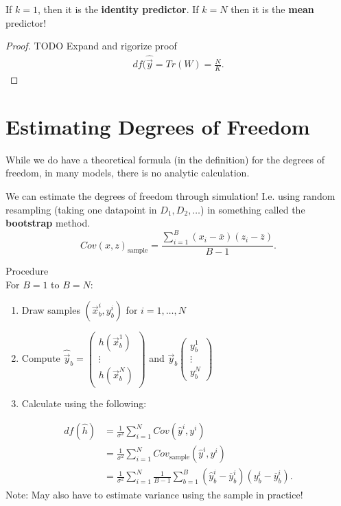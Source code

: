 \documentclass[a4paper]{article}
\begin{document}
\begin{remark}
  If $k=1$, then it is the \textbf{identity predictor}. If $k=N$ then it is the \textbf{mean} predictor!
\end{remark}

\begin{proof}
  TODO Expand and rigorize proof
  \begin{align*}
    df(\hat{\vec{y}} = Tr(W) = \frac{N}{K}
  .\end{align*}
\end{proof}

\section{Estimating Degrees of Freedom}
While we do have a theoretical formula (in the definition) for the degrees of freedom, in many 
models, there is no analytic calculation.

We can estimate the degrees of freedom through simulation! I.e. using random resampling 
(taking one datapoint in $D_1, D_2, \ldots$) in something called the \textbf{bootstrap} method.
 \[
   Cov(x,z)_{\text{sample}} = \frac{\sum_{i=1}^B (x_i - \overline{x})\left( z_i - \overline{z} \right) }{B-1}
.\] 

\begin{note}{Procedure}\\
  For $B=1$ to $B=N$:
  \begin{enumerate}
    \item Draw samples $\left( \vec{x}_b^i, y_b^i \right) $ for $i=1,\ldots,N$
    \item Compute $\hat{\vec{y}}_b = \begin{pmatrix} h(\vec{x}^1_b)\\ \vdots\\ h(\vec{x}^N_b) \end{pmatrix}$ 
      and $\vec{y}_b\begin{pmatrix} y_b^1\\ \vdots\\ y_b^N \end{pmatrix}$\
    \item Calculate using the following:
  \end{enumerate}

  \begin{align*}
    df(\hat{h}) &= \frac{1}{\sigma^2} \sum_{i=1}^N Cov(\hat{y}^i, y^i) \\
                &= \frac{1}{\sigma^2} \sum_{i=1}^N Cov_{\text{sample}} \left(\hat{y}^i, y^i \right) \\
                &= \frac{1}{\sigma^2} \sum_{i=1}^N \frac{1}{B-1} \sum_{b=1}^B \left( \hat{y}_b^i - \overline{y}_b^i  \right) 
                \left( y_b^i - \overline{y}_b^i \right) 
  .\end{align*}
  Note: May also have to estimate variance using the sample in practice!
\end{note}
\end{document}
